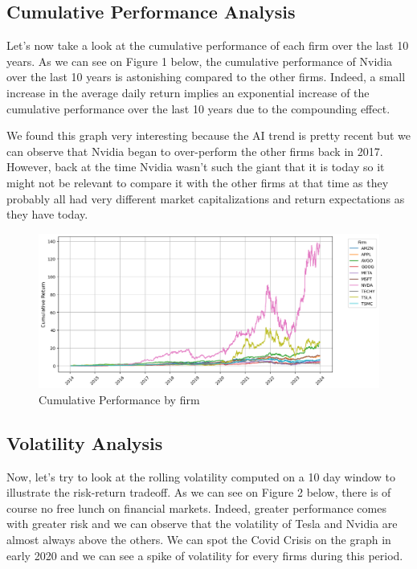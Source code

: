 \documentclass[12pt, oneside]{article}
\begin{document}
\subsection{Cumulative Performance Analysis}
Let's now take a look at the cumulative performance of each firm over the last 10 years. As we can see on Figure 1 below, the cumulative performance of Nvidia over the last 10 years is astonishing compared to the other firms. Indeed, a small increase in the average daily return implies an exponential increase of the cumulative performance over the last 10 years due to the compounding effect. 

We found this graph very interesting because the AI trend is pretty recent but we can observe that Nvidia began to over-perform the other firms back in 2017. However, back at the time Nvidia wasn't such the giant that it is today so it might not be relevant to compare it with the other firms at that time as they probably all had very different market capitalizations and return expectations as they have today.

\begin{figure}[H]
    \centering
    \includegraphics[width=0.8\linewidth]{../images/cum_perf_analysis.png}
    \caption{Cumulative Performance by firm}
    \label{fig:cum_perf}
\end{figure}


\subsection{Volatility Analysis}
Now, let's try to look at the rolling volatility computed on a 10 day window to illustrate the risk-return tradeoff. As we can see on Figure 2 below, there is of course no free lunch on financial markets. Indeed, greater performance comes with greater risk and we can observe that the volatility of Tesla and Nvidia are almost always above the others. We can spot the Covid Crisis on the graph in early 2020 and we can see a spike of volatility for every firms during this period.
\end{document}
